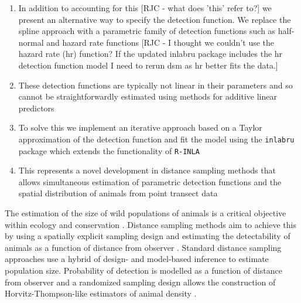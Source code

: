 \documentclass[preprint,12pt]{elsarticle}
\begin{document}
\begin{enumerate}
	\item In addition to accounting for this [RJC - what does 'this' refer to?] we present an alternative way to specify the detection function.  We replace the spline approach with a parametric family of detection functions such as half-normal and hazard rate functions [RJC - I thought we couldn't use the hazard rate (hr) function? If the updated inlabru package includes the hr detection function model I need to rerun dsm as hr better fits the data.]
	\item  These detection functions are typically not linear in their parameters and so cannot be straightforwardly estimated using methods for additive linear predictors
	\item To solve this we implement an iterative approach based on a Taylor approximation of the detection function and fit the model using the \texttt{inlabru} package which extends the functionality of \texttt{R-INLA}
	\item This represents a novel development in distance sampling methods that allows simultaneous estimation of parametric detection functions and the spatial distribution of animals from point transect data
\end{enumerate}

The estimation of the size of wild populations of animals is a critical objective within ecology and conservation \citep{schwarz_estimating_1999}.  Distance sampling methods aim to achieve this by using a spatially explicit sampling design and estimating the detectability of animals as a function of distance from observer \citep{buckland_advanced_2008, buckland_distance_2015}.  Standard distance sampling approaches use a hybrid of design- and model-based inference to estimate population size.  Probability of detection is modelled as a function of distance from observer and a randomized sampling design allows the construction of Horvitz-Thompson-like estimators of animal density \citep{horvitz_generalization_1952,  buckland_advanced_2008}.
\end{document}
